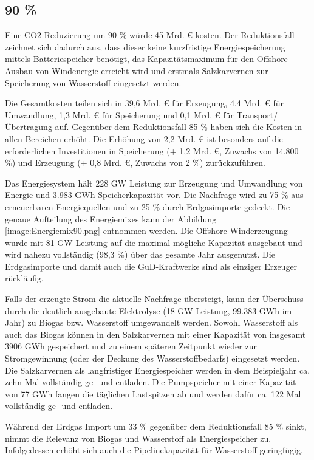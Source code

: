 \subsection{90 \%}
Eine CO2 Reduzierung um 90 \% würde 45 Mrd. € kosten. Der Reduktionsfall zeichnet sich dadurch aus, dass dieser keine kurzfristige Energiespeicherung mittels Batteriespeicher benötigt, das Kapazitätsmaximum für den Offshore Ausbau von Windenergie erreicht wird und erstmals Salzkarvernen zur Speicherung von Wasserstoff eingesetzt werden.

Die Gesamtkosten teilen sich in 39,6 Mrd. € für Erzeugung, 4,4 Mrd. € für Umwandlung, 1,3 Mrd. € für Speicherung und 0,1 Mrd. € für Transport/Übertragung auf. Gegenüber dem Reduktionsfall 85 \% haben sich die Kosten in allen Bereichen erhöht. Die Erhöhung von 2,2 Mrd. € ist besonders auf die erforderlichen Investitionen in Speicherung (+ 1,2 Mrd. €, Zuwachs von 14.800 \%) und Erzeugung (+ 0,8 Mrd. €, Zuwachs von 2 \%) zurückzuführen.

Das Energiesystem hält 228 GW Leistung zur Erzeugung und Umwandlung von Energie und 3.983 GWh Speicherkapazität vor. Die Nachfrage wird zu 75 \% aus erneuerbaren Energiequellen und zu 25 \% durch Erdgasimporte gedeckt. Die genaue Aufteilung des Energiemixes kann der Abbildung \ref{image:Energiemix90.png} entnommen werden. Die Offshore Winderzeugung wurde mit 81 GW Leistung auf die maximal mögliche Kapazität ausgebaut und wird nahezu vollständig (98,3 \%) über das gesamte Jahr ausgenutzt. 
Die Erdgasimporte und damit auch die GuD-Kraftwerke sind als einziger Erzeuger rückläufig.  


Falls der erzeugte Strom die aktuelle Nachfrage übersteigt, kann der Überschuss durch die deutlich ausgebaute Elektrolyse (18 GW Leistung, 99.383 GWh im Jahr) zu Biogas bzw. Wasserstoff umgewandelt werden. Sowohl Wasserstoff als auch das Biogas können in den Salzkarvernen mit einer Kapazität von insgesamt 3906 GWh gespeichert und zu einem späteren Zeitpunkt wieder zur Stromgewinnung (oder der Deckung des Wasserstoffbedarfs) eingesetzt werden. Die Salzkarvernen als langfristiger Energiespeicher werden in dem Beispieljahr ca. zehn Mal vollständig ge- und entladen. Die Pumpspeicher mit einer Kapazität von 77 GWh fangen die täglichen Lastspitzen ab und werden dafür ca. 122 Mal vollständig ge- und entladen.

Während der Erdgas Import um 33 \% gegenüber dem Reduktionsfall 85 \% sinkt, nimmt die Relevanz von Biogas und Wasserstoff als Energiespeicher zu. Infolgedessen erhöht sich auch die Pipelinekapazität für Wasserstoff geringfügig. 

